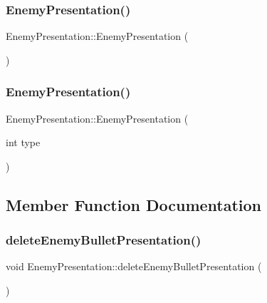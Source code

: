 \subsubsection{\texorpdfstring{Enemy\+Presentation()}{EnemyPresentation()}\hspace{0.1cm}{\footnotesize\ttfamily [1/2]}}
{\footnotesize\ttfamily Enemy\+Presentation\+::\+Enemy\+Presentation (\begin{DoxyParamCaption}{ }\end{DoxyParamCaption})}

\mbox{\label{class_enemy_presentation_a78e7f250c31e2e6d6327ead1ef12f4c8}} 
\subsubsection{\texorpdfstring{Enemy\+Presentation()}{EnemyPresentation()}\hspace{0.1cm}{\footnotesize\ttfamily [2/2]}}
{\footnotesize\ttfamily Enemy\+Presentation\+::\+Enemy\+Presentation (\begin{DoxyParamCaption}\item[{int}]{type }\end{DoxyParamCaption})}



\subsection{Member Function Documentation}
\mbox{\label{class_enemy_presentation_abad20ddfb250e1c31a4d4581fa7d2571}} 
\subsubsection{\texorpdfstring{delete\+Enemy\+Bullet\+Presentation()}{deleteEnemyBulletPresentation()}}
{\footnotesize\ttfamily void Enemy\+Presentation\+::delete\+Enemy\+Bullet\+Presentation (\begin{DoxyParamCaption}{ }\end{DoxyParamCaption})}

